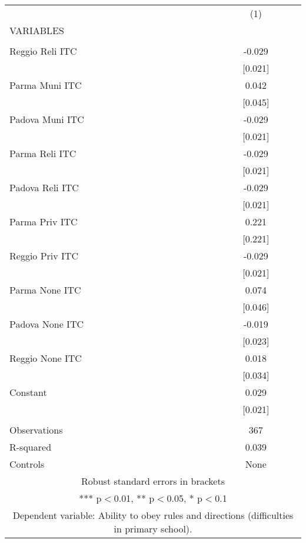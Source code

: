 \begin{tabular}{lc} \hline
 & (1) \\
VARIABLES &  \\ \hline
 &  \\
Reggio Reli ITC & -0.029 \\
 & [0.021] \\
Parma Muni ITC & 0.042 \\
 & [0.045] \\
Padova Muni ITC & -0.029 \\
 & [0.021] \\
Parma Reli ITC & -0.029 \\
 & [0.021] \\
Padova Reli ITC & -0.029 \\
 & [0.021] \\
Parma Priv ITC & 0.221 \\
 & [0.221] \\
Reggio Priv ITC & -0.029 \\
 & [0.021] \\
Parma None ITC & 0.074 \\
 & [0.046] \\
Padova None ITC & -0.019 \\
 & [0.023] \\
Reggio None ITC & 0.018 \\
 & [0.034] \\
Constant & 0.029 \\
 & [0.021] \\
 &  \\
Observations & 367 \\
R-squared & 0.039 \\
 Controls & None \\ \hline
\multicolumn{2}{c}{ Robust standard errors in brackets} \\
\multicolumn{2}{c}{ *** p$<$0.01, ** p$<$0.05, * p$<$0.1} \\
\multicolumn{2}{c}{ Dependent variable: Ability to obey rules and directions (difficulties in primary school).} \\
\end{tabular}
